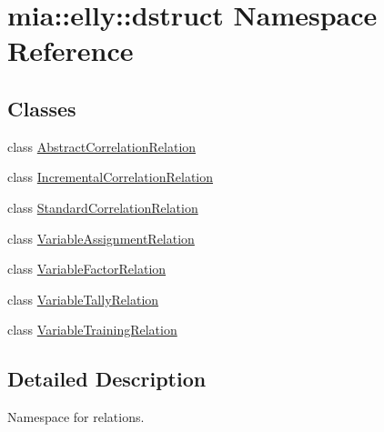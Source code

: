 \hypertarget{namespacemia_1_1elly_1_1dstruct}{\section{mia\-:\-:elly\-:\-:dstruct Namespace Reference}
\label{namespacemia_1_1elly_1_1dstruct}
}
\subsection*{Classes}
\begin{DoxyCompactItemize}
\item 
class \hyperlink{classmia_1_1elly_1_1dstruct_1_1_abstract_correlation_relation}{Abstract\-Correlation\-Relation}
\item 
class \hyperlink{classmia_1_1elly_1_1dstruct_1_1_incremental_correlation_relation}{Incremental\-Correlation\-Relation}
\item 
class \hyperlink{classmia_1_1elly_1_1dstruct_1_1_standard_correlation_relation}{Standard\-Correlation\-Relation}
\item 
class \hyperlink{classmia_1_1elly_1_1dstruct_1_1_variable_assignment_relation}{Variable\-Assignment\-Relation}
\item 
class \hyperlink{classmia_1_1elly_1_1dstruct_1_1_variable_factor_relation}{Variable\-Factor\-Relation}
\item 
class \hyperlink{classmia_1_1elly_1_1dstruct_1_1_variable_tally_relation}{Variable\-Tally\-Relation}
\item 
class \hyperlink{classmia_1_1elly_1_1dstruct_1_1_variable_training_relation}{Variable\-Training\-Relation}
\end{DoxyCompactItemize}


\subsection{Detailed Description}
Namespace for relations. 